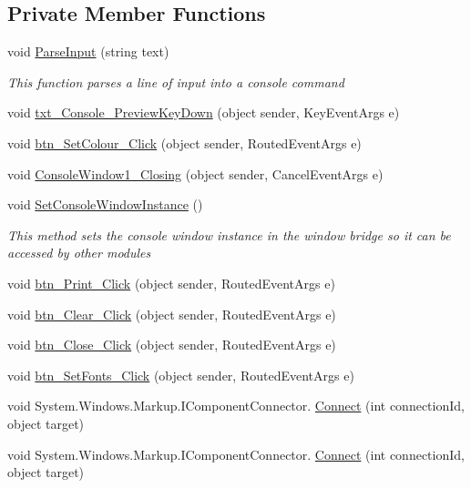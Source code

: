\subsection*{Private Member Functions}
\begin{DoxyCompactItemize}
\item 
void \hyperlink{class_c_p_u___o_s___simulator_1_1_console_window_a0a66aa7f0e333cc919589a7ce4d584c0}{Parse\+Input} (string text)
\begin{DoxyCompactList}\small\item\em This function parses a line of input into a console command \end{DoxyCompactList}\item 
void \hyperlink{class_c_p_u___o_s___simulator_1_1_console_window_aabd331e8c3a83c87ccd2e09c3959408d}{txt\+\_\+\+Console\+\_\+\+Preview\+Key\+Down} (object sender, Key\+Event\+Args e)
\item 
void \hyperlink{class_c_p_u___o_s___simulator_1_1_console_window_a1de6be8bb7f4f581a9e4131a0408e632}{btn\+\_\+\+Set\+Colour\+\_\+\+Click} (object sender, Routed\+Event\+Args e)
\item 
void \hyperlink{class_c_p_u___o_s___simulator_1_1_console_window_a6b842220939aa42076c6770d646e2cc3}{Console\+Window1\+\_\+\+Closing} (object sender, Cancel\+Event\+Args e)
\item 
void \hyperlink{class_c_p_u___o_s___simulator_1_1_console_window_a8719d25b2617a32a78511d9e584d90a0}{Set\+Console\+Window\+Instance} ()
\begin{DoxyCompactList}\small\item\em This method sets the console window instance in the window bridge so it can be accessed by other modules \end{DoxyCompactList}\item 
void \hyperlink{class_c_p_u___o_s___simulator_1_1_console_window_ae362d36774ccfa84e775d6460e938a47}{btn\+\_\+\+Print\+\_\+\+Click} (object sender, Routed\+Event\+Args e)
\item 
void \hyperlink{class_c_p_u___o_s___simulator_1_1_console_window_a5bdaca75d834561bcf3e8ebef9f74926}{btn\+\_\+\+Clear\+\_\+\+Click} (object sender, Routed\+Event\+Args e)
\item 
void \hyperlink{class_c_p_u___o_s___simulator_1_1_console_window_ac971a3a0719009235a1dc369f6436df1}{btn\+\_\+\+Close\+\_\+\+Click} (object sender, Routed\+Event\+Args e)
\item 
void \hyperlink{class_c_p_u___o_s___simulator_1_1_console_window_a9b4298ff51320694cef9d160759700a3}{btn\+\_\+\+Set\+Fonts\+\_\+\+Click} (object sender, Routed\+Event\+Args e)
\item 
void System.\+Windows.\+Markup.\+I\+Component\+Connector. \hyperlink{class_c_p_u___o_s___simulator_1_1_console_window_a8fc3e3f38ff00f6239dca33ff68de0d2}{Connect} (int connection\+Id, object target)
\item 
void System.\+Windows.\+Markup.\+I\+Component\+Connector. \hyperlink{class_c_p_u___o_s___simulator_1_1_console_window_a8fc3e3f38ff00f6239dca33ff68de0d2}{Connect} (int connection\+Id, object target)
\end{DoxyCompactItemize}
